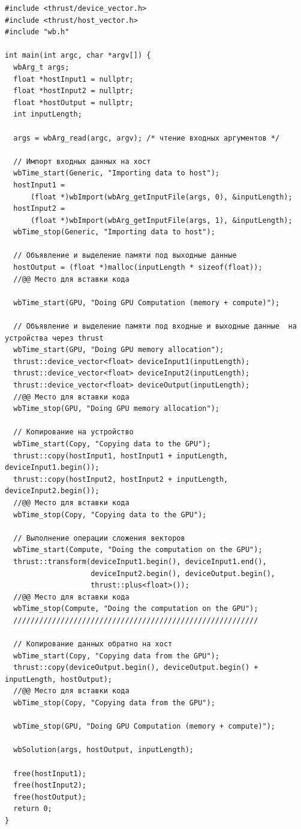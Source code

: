\documentclass[14pt]{extarticle}
\newenvironment{code}{\captionsetup{type=listing, belowskip=-14pt plus 3pt minus 0pt}}{}
\begin{document}
\begin{code}    
\caption{Содержание rvs\_laboratories\_2/main.cu\label{lst:main}}
\begin{verbatim}
#include <thrust/device_vector.h>
#include <thrust/host_vector.h>
#include "wb.h"

int main(int argc, char *argv[]) {
  wbArg_t args;
  float *hostInput1 = nullptr;
  float *hostInput2 = nullptr;
  float *hostOutput = nullptr;
  int inputLength;

  args = wbArg_read(argc, argv); /* чтение входных аргументов */

  // Импорт входных данных на хост
  wbTime_start(Generic, "Importing data to host");
  hostInput1 =
      (float *)wbImport(wbArg_getInputFile(args, 0), &inputLength);
  hostInput2 =
      (float *)wbImport(wbArg_getInputFile(args, 1), &inputLength);
  wbTime_stop(Generic, "Importing data to host");

  // Объявление и выделение памяти под выходные данные
  hostOutput = (float *)malloc(inputLength * sizeof(float));
  //@@ Место для вставки кода

  wbTime_start(GPU, "Doing GPU Computation (memory + compute)");

  // Объявление и выделение памяти под входные и выходные данные  на устройства через thrust
  wbTime_start(GPU, "Doing GPU memory allocation");
  thrust::device_vector<float> deviceInput1(inputLength);
  thrust::device_vector<float> deviceInput2(inputLength);
  thrust::device_vector<float> deviceOutput(inputLength);
  //@@ Место для вставки кода
  wbTime_stop(GPU, "Doing GPU memory allocation");

  // Копирование на устройство
  wbTime_start(Copy, "Copying data to the GPU");
  thrust::copy(hostInput1, hostInput1 + inputLength, deviceInput1.begin());
  thrust::copy(hostInput2, hostInput2 + inputLength, deviceInput2.begin());
  //@@ Место для вставки кода
  wbTime_stop(Copy, "Copying data to the GPU");

  // Выполнение операции сложения векторов
  wbTime_start(Compute, "Doing the computation on the GPU");
  thrust::transform(deviceInput1.begin(), deviceInput1.end(),
                    deviceInput2.begin(), deviceOutput.begin(),
                    thrust::plus<float>());
  //@@ Место для вставки кода
  wbTime_stop(Compute, "Doing the computation on the GPU");
  /////////////////////////////////////////////////////////

  // Копирование данных обратно на хост
  wbTime_start(Copy, "Copying data from the GPU");
  thrust::copy(deviceOutput.begin(), deviceOutput.begin() + inputLength, hostOutput);
  //@@ Место для вставки кода
  wbTime_stop(Copy, "Copying data from the GPU");

  wbTime_stop(GPU, "Doing GPU Computation (memory + compute)");

  wbSolution(args, hostOutput, inputLength);

  free(hostInput1);
  free(hostInput2);
  free(hostOutput);
  return 0;
}
\end{verbatim}
\end{code}
\end{document}
